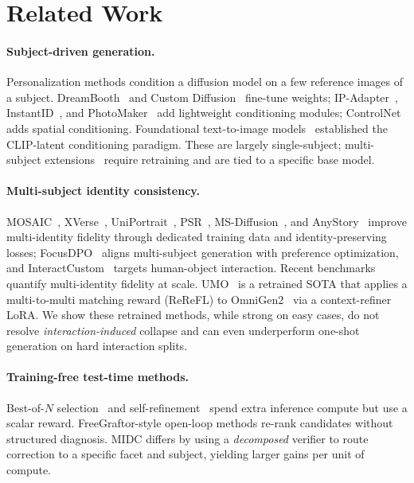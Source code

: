 \documentclass[letterpaper]{article}
\begin{document}
\section{Related Work}

\paragraph{Subject-driven generation.} Personalization methods condition a diffusion model on a few reference images of a subject. DreamBooth~\citep{ruiz2023dreambooth} and Custom Diffusion~\citep{kumari2023multi} fine-tune weights; IP-Adapter~\citep{ye2023ip}, InstantID~\citep{wang2024instantid}, and PhotoMaker~\citep{li2024photomaker} add lightweight conditioning modules; ControlNet~\citep{zhang2023adding} adds spatial conditioning. Foundational text-to-image models~\citep{ramesh2022hierarchical} established the CLIP-latent conditioning paradigm. These are largely single-subject; multi-subject extensions~\citep{xiao2023fastcomposer,gu2024mix,he2024uniportrait,she2025mosaic,chen2025xverse,wang2024ms,he2025anystory} require retraining and are tied to a specific base model.

\paragraph{Multi-subject identity consistency.} MOSAIC~\citep{she2025mosaic}, XVerse~\citep{chen2025xverse}, UniPortrait~\citep{he2024uniportrait}, PSR~\citep{wang2025psr}, MS-Diffusion~\citep{wang2024ms}, and AnyStory~\citep{he2025anystory} improve multi-identity fidelity through dedicated training data and identity-preserving losses; FocusDPO~\citep{jin2025focusdpo} aligns multi-subject generation with preference optimization, and InteractCustom~\citep{xu2025interactcustom} targets human-object interaction. Recent benchmarks~\citep{borse2025multihuman,oshima2025multibanana} quantify multi-identity fidelity at scale. UMO~\citep{cheng2025umo} is a retrained SOTA that applies a multi-to-multi matching reward (ReReFL) to OmniGen2~\citep{wu2025omnigen2} via a context-refiner LoRA. We show these retrained methods, while strong on easy cases, do not resolve \emph{interaction-induced} collapse and can even underperform one-shot generation on hard interaction splits.

\paragraph{Training-free test-time methods.} Best-of-$N$ selection~\citep{snell2024testtime,cobbe2021gsm8k} and self-refinement~\citep{madaan2023selfrefine} spend extra inference compute but use a scalar reward. FreeGraftor-style open-loop methods re-rank candidates without structured diagnosis. MIDC differs by using a \emph{decomposed} verifier to route correction to a specific facet and subject, yielding larger gains per unit of compute.
\end{document}
